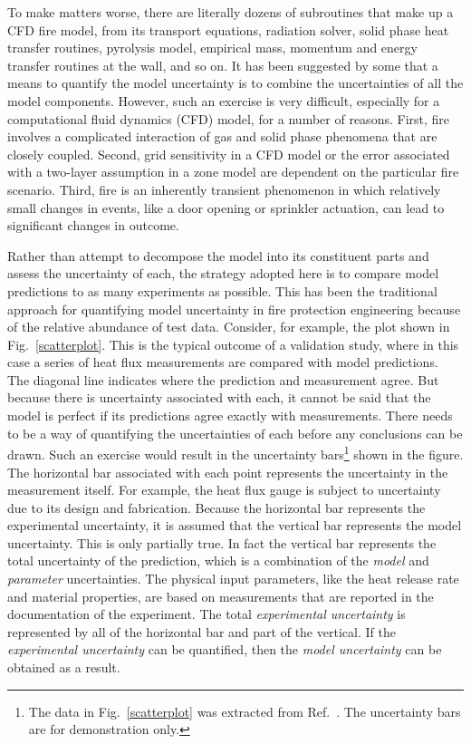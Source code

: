 To make matters worse, there are literally dozens of subroutines that make up a CFD fire model,
from its transport equations, radiation solver, solid phase heat transfer routines, pyrolysis model,
empirical mass, momentum and energy transfer routines at the wall, and so on.
It has been suggested by some that
a means to quantify the model uncertainty is to combine the uncertainties of all the model
components.
However, such an exercise is very difficult, especially for a computational fluid dynamics (CFD) model,
for a number of reasons. First, fire involves
a complicated interaction of gas and solid phase phenomena that are closely coupled.
Second, grid sensitivity in a CFD model or the error associated with
a two-layer assumption in a zone model are dependent on the particular fire scenario.
Third, fire is an inherently transient phenomenon in which relatively small
changes in events, like a door opening or sprinkler actuation, can lead to significant changes in outcome.

Rather than attempt to decompose the model into its constituent parts and assess the uncertainty of
each, the strategy adopted here is to compare model predictions to as many
experiments as possible. This has been the traditional approach for quantifying model uncertainty in fire
protection engineering because of the relative abundance of test data. Consider, for example, the
plot shown in Fig.~\ref{scatterplot}. This is the typical outcome of a validation study, where in this case a series of
heat flux measurements are compared with model predictions.
The diagonal line indicates where the prediction and measurement agree.
But because there is uncertainty associated with each, it cannot be said that the model is perfect if its predictions
agree exactly with measurements.
There needs to be a way of quantifying the uncertainties of each before any conclusions can be drawn.
Such an exercise would result in the uncertainty
bars\footnote{The data in Fig.~\ref{scatterplot} was extracted from Ref.~\cite{NUREG_1824_Sup_1}.
The uncertainty bars are for demonstration only.}
shown in the figure. The
horizontal bar associated with each point represents the uncertainty in the measurement itself.
For example, the heat flux gauge is subject to uncertainty due to its design and fabrication.
Because the horizontal bar represents the experimental uncertainty, it is assumed that the vertical
bar represents the model uncertainty. This is only partially true. In fact the vertical bar represents the total
uncertainty of the prediction, which is a combination of the {\em model} and {\em parameter} uncertainties. The physical
input parameters, like the heat release rate and material properties, are based on measurements that are reported
in the documentation of the experiment.
The total {\em experimental uncertainty} is represented by all of the horizontal bar and part of the vertical.
If the {\em experimental uncertainty} can be quantified, then the {\em model uncertainty} can be obtained as a result.



